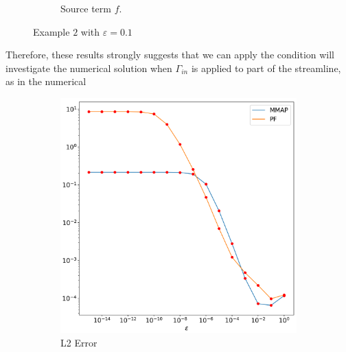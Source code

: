 \documentclass[12pt]{ociamthesis}
\begin{document}
\begin{figure}[H]
\begin{subfigure}{0.5\textwidth}
     \caption{Source term $f$.}
 \end{subfigure}
 \caption{Example $2$ with $\varepsilon = 0.1$} \label{E2_uf}
\end{figure}

Therefore, these results strongly suggests that we can apply the condition  will investigate the numerical solution when $\Gamma_{in}$ is applied to part of the streamline, as in the numerical

\begin{figure}[H]
 \begin{subfigure}{0.44\textwidth}
     \includegraphics[width=\textwidth]{Pics/LHSims/E2/E2_NormalL2.png}
     \caption{L2 Error}
 \end{subfigure}
   \begin{subfigure}{0.44\textwidth}

\end{subfigure}
\end{figure}
\end{document}
